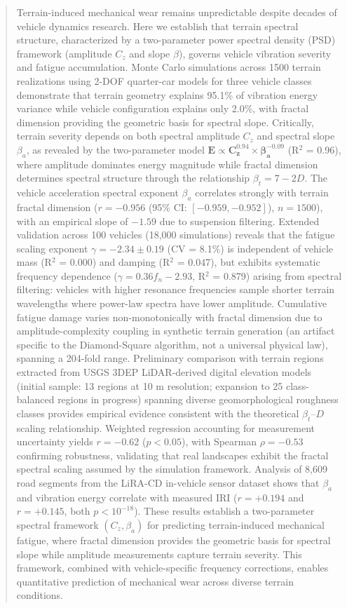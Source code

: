 \documentclass[11pt]{article}
\begin{document}
\begin{abstract}
Terrain-induced mechanical wear remains unpredictable despite decades of vehicle dynamics research. Here we establish that terrain spectral structure, characterized by a two-parameter power spectral density (PSD) framework (amplitude $C_z$ and slope $\beta$), governs vehicle vibration severity and fatigue accumulation. Monte Carlo simulations across 1500 terrain realizations using 2-DOF quarter-car models for three vehicle classes demonstrate that terrain geometry explains 95.1\% of vibration energy variance while vehicle configuration explains only 2.0\%, with fractal dimension providing the geometric basis for spectral slope. Critically, terrain severity depends on both spectral amplitude $C_z$ and spectral slope $\beta_a$, as revealed by the two-parameter model $\mathbf{E \propto C_z^{0.94} \times \beta_a^{-0.09}}$ (R$^2$ = 0.96), where amplitude dominates energy magnitude while fractal dimension determines spectral structure through the relationship $\beta_t = 7-2D$. The vehicle acceleration spectral exponent $\beta_a$ correlates strongly with terrain fractal dimension ($r = -0.956$ (95\% CI: $[-0.959, -0.952]$), $n=1500$), with an empirical slope of $-1.59$ due to suspension filtering. Extended validation across 100 vehicles (18,000 simulations) reveals that the fatigue scaling exponent $\gamma = -2.34 \pm 0.19$ (CV = 8.1\%) is independent of vehicle mass (R$^2$ = 0.000) and damping (R$^2$ = 0.047), but exhibits systematic frequency dependence ($\gamma = 0.36 f_n - 2.93$, R$^2$ = 0.879) arising from spectral filtering: vehicles with higher resonance frequencies sample shorter terrain wavelengths where power-law spectra have lower amplitude. Cumulative fatigue damage varies non-monotonically with fractal dimension due to amplitude-complexity coupling in synthetic terrain generation (an artifact specific to the Diamond-Square algorithm, not a universal physical law), spanning a 204-fold range. Preliminary comparison with terrain regions extracted from USGS 3DEP LiDAR-derived digital elevation models (initial sample: 13 regions at 10 m resolution; expansion to 25 class-balanced regions in progress) spanning diverse geomorphological roughness classes provides empirical evidence consistent with the theoretical $\beta_t$--$D$ scaling relationship. Weighted regression accounting for measurement uncertainty yields $r = -0.62$ ($p < 0.05$), with Spearman $\rho = -0.53$ confirming robustness, validating that real landscapes exhibit the fractal spectral scaling assumed by the simulation framework. Analysis of 8,609 road segments from the LiRA-CD in-vehicle sensor dataset shows that $\beta_a$ and vibration energy correlate with measured IRI ($r = +0.194$ and $r = +0.145$, both $p < 10^{-18}$). These results establish a two-parameter spectral framework $(C_z, \beta_a)$ for predicting terrain-induced mechanical fatigue, where fractal dimension provides the geometric basis for spectral slope while amplitude measurements capture terrain severity. This framework, combined with vehicle-specific frequency corrections, enables quantitative prediction of mechanical wear across diverse terrain conditions.
\end{abstract}
\end{document}

